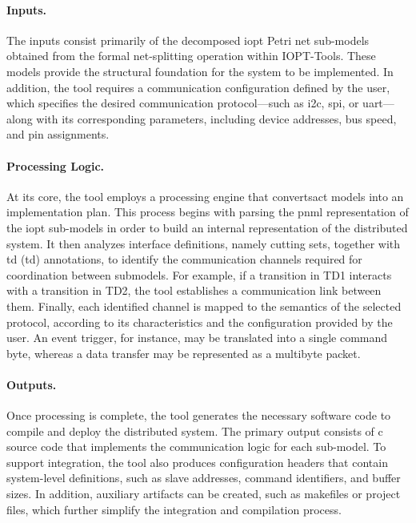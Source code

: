 \paragraph{Inputs.}
The inputs consist primarily of the decomposed \gls{iopt} Petri net sub-models obtained from the formal net-splitting operation within IOPT-Tools. These models provide the structural foundation for the system to be implemented. In addition, the tool requires a communication configuration defined by the user, which specifies the desired communication protocol—such as \gls{i2c}, \gls{spi}, or \gls{uart}—along with its corresponding parameters, including device addresses, bus speed, and pin assignments.

\paragraph{Processing Logic.}
At its core, the tool employs a processing engine that convertsact models into an implementation plan. This process begins with parsing the \gls{pnml} representation of the \gls{iopt} sub-models in order to build an internal representation of the distributed system. It then analyzes interface definitions, namely cutting sets, together with \gls{td} (\gls{td}) annotations, to identify the communication channels required for coordination between submodels. For example, if a transition in TD1 interacts with a transition in TD2, the tool establishes a communication link between them. Finally, each identified channel is mapped to the semantics of the selected protocol, according to its characteristics and the configuration provided by the user. An event trigger, for instance, may be translated into a single command byte, whereas a data transfer may be represented as a multibyte packet.

\paragraph{Outputs.}
Once processing is complete, the tool generates the necessary software code to compile and deploy the distributed system. The primary output consists of \gls{c} source code that implements the communication logic for each sub-model. To support integration, the tool also produces configuration headers that contain system-level definitions, such as slave addresses, command identifiers, and buffer sizes. In addition, auxiliary artifacts can be created, such as makefiles or project files, which further simplify the integration and compilation process.


